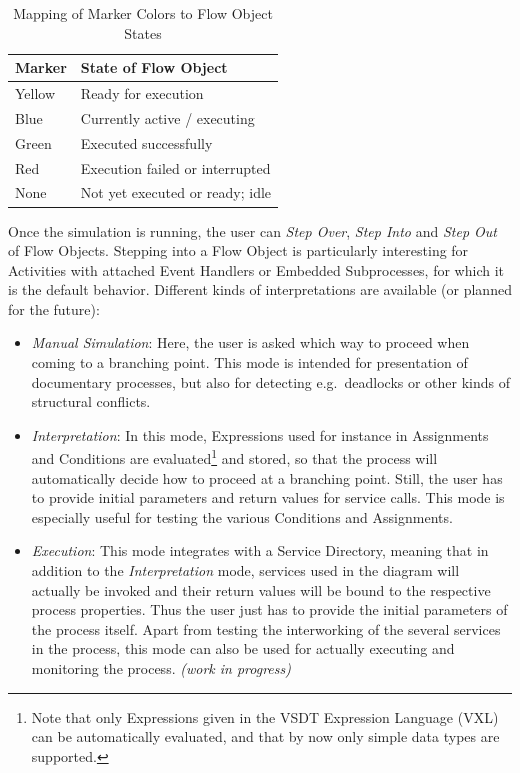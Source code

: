 \begin{table}[ht]
	\centering
	\caption{Mapping of Marker Colors to Flow Object States}
	\begin{tabular}{l|l}
		\bf Marker & \bf State of Flow Object       \\
		\hline
		Yellow    & Ready for execution             \\
		Blue      & Currently active / executing    \\
		Green     & Executed successfully            \\
		Red       & Execution failed or interrupted \\
		None      & Not yet executed or ready; idle \\
	\end{tabular}
	\label{tab:markerColors}
\end{table}

Once the simulation is running, the user can \emph{Step Over}, \emph{Step Into}
and \emph{Step Out} of Flow Objects.  Stepping into a Flow Object is particularly
interesting for Activities with attached Event Handlers or Embedded Subprocesses,
for which it is the default behavior.  Different kinds of interpretations are
available (or planned for the future):
\begin{itemize}
	\item \emph{Manual Simulation}: Here, the user is asked which way to proceed
	when coming to a branching point.  This mode is intended for presentation of
	documentary processes, but also for detecting e.g.\ deadlocks or other kinds
	of structural conflicts.
	
	\item \emph{Interpretation}: In this mode, Expressions used for instance in
	Assignments and Conditions are evaluated\footnote{Note that only Expressions
	given in the VSDT Expression Language (VXL) can be automatically evaluated,
	and that by now only simple data types are supported.} and stored, so that
	the process will automatically decide how to proceed at a branching point.
	Still, the user has to provide initial parameters and return values for
	service calls.  This mode is especially useful for testing the various
	Conditions and Assignments.
	
	\item \emph{Execution}: This mode integrates with a Service Directory, meaning
	that in addition to the \emph{Interpretation} mode, services used in the
	diagram will actually be invoked and their return values will be bound to the
	respective process properties.  Thus the user just has to provide the initial
	parameters of the process itself.  Apart from testing the interworking of the
	several services in the process, this mode can also be used for actually
	executing and monitoring the process. \emph{(work in progress)}
\end{itemize}


